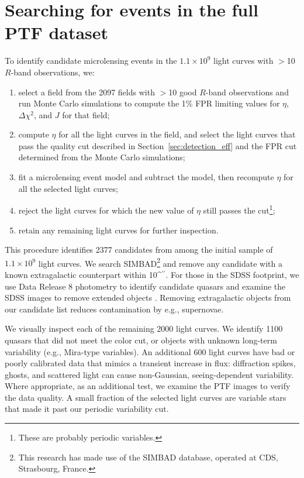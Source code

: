 \documentclass{emulateapj}
\def\asec{\ifmmode^{\prime\prime}\else$^{\prime\prime}$\fi}
\newcommand{\apwsim}{\raisebox{0.2ex}{\scriptsize$\sim$\normalsize}}
\begin{document}
\section{Searching for events in the full PTF dataset}
To identify candidate microlensing events in the $1.1\times10^9$ light curves with $>$10 $R$-band observations, we:
\begin{enumerate}
	\item select a field from the 2097 fields with $>$10 good $R$-band observations and run Monte Carlo simulations to compute the 1\% FPR limiting values for $\eta$, $\Delta \chi^2$, and $J$ for that field;
	\item compute $\eta$ for all the light curves in the field, and select the light curves that pass the quality cut described in Section~\ref{sec:detection_eff} and the FPR cut determined from the Monte Carlo simulations;
	\item fit a microlensing event model and subtract the model, then recompute $\eta$ for all the selected light curves;
	\item reject the light curves for which the new value of $\eta$ still passes the cut\footnote{These are probably periodic variables.};
	\item retain any remaining light curves for further inspection.
\end{enumerate}

This procedure identifies 2377 candidates from among the initial sample of $1.1\times10^9$ light curves. We search SIMBAD\footnote{This research has made use of the SIMBAD database, operated at CDS, Strasbourg, France.} and remove any candidate with a known extragalactic counterpart within 10\asec. For those in the SDSS footprint, we use Data Release 8 photometry \citep{DR8paper} to identify candidate quasars \citep{richards02} and examine the SDSS images to remove extended objects \citep{sdss_images}. Removing extragalactic objects from our candidate list reduces contamination by e.g., supernovae. 

We visually inspect each of the remaining \apwsim2000 light curves. We identify \apwsim1100 quasars that did not meet the \cite{richards02} color cut, or objects with unknown long-term variability (e.g., Mira-type variables). An additional \apwsim600 light curves have bad or poorly calibrated data that mimics a transient increase in flux: diffraction spikes, ghosts, and scattered light can cause non-Gaussian, seeing-dependent variability. Where appropriate, as an additional test, we examine the PTF images to verify the data quality. A small fraction of the selected light curves are variable stars that made it past our periodic variability cut. 
\end{document}
